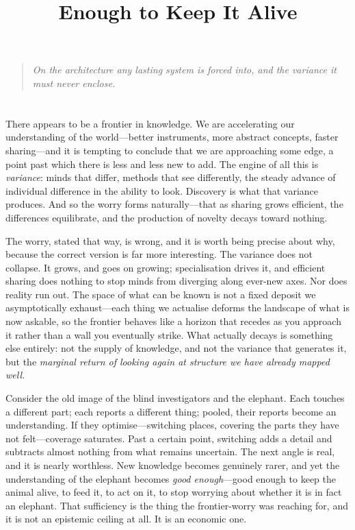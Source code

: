 \documentclass{article}
\title{Enough to Keep It Alive}
\author{}
\date{}
\begin{document}
\maketitle

\begin{quote}
\textit{On the architecture any lasting system is forced into, and the variance it must never enclose.}
\end{quote}

\section*{}

There appears to be a frontier in knowledge. We are accelerating our understanding of the world---better instruments, more abstract concepts, faster sharing---and it is tempting to conclude that we are approaching some edge, a point past which there is less and less new to add. The engine of all this is \textit{variance}: minds that differ, methods that see differently, the steady advance of individual difference in the ability to look. Discovery is what that variance produces. And so the worry forms naturally---that as sharing grows efficient, the differences equilibrate, and the production of novelty decays toward nothing.

The worry, stated that way, is wrong, and it is worth being precise about why, because the correct version is far more interesting. The variance does not collapse. It grows, and goes on growing; specialisation drives it, and efficient sharing does nothing to stop minds from diverging along ever-new axes. Nor does reality run out. The space of what can be known is not a fixed deposit we asymptotically exhaust---each thing we actualise deforms the landscape of what is now askable, so the frontier behaves like a horizon that recedes as you approach it rather than a wall you eventually strike. What actually decays is something else entirely: not the supply of knowledge, and not the variance that generates it, but the \textit{marginal return of looking again at structure we have already mapped well.}

Consider the old image of the blind investigators and the elephant. Each touches a different part; each reports a different thing; pooled, their reports become an understanding. If they optimise---switching places, covering the parts they have not felt---coverage saturates. Past a certain point, switching adds a detail and subtracts almost nothing from what remains uncertain. The next angle is real, and it is nearly worthless. New knowledge becomes genuinely rarer, and yet the understanding of the elephant becomes \textit{good enough}---good enough to keep the animal alive, to feed it, to act on it, to stop worrying about whether it is in fact an elephant. That sufficiency is the thing the frontier-worry was reaching for, and it is not an epistemic ceiling at all. It is an economic one.
\end{document}
